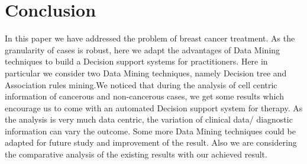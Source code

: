 \documentclass[conference]{IEEEtran}
\begin{document}




\section{Conclusion}
In this paper we have addressed the problem of breast cancer treatment. As the granularity of cases is robust,  here we adapt the advantages of Data Mining techniques to build a Decision support systems for practitioners. Here in particular we consider two Data Mining techniques, namely Decision tree and Association rules mining.We noticed that during the analysis of cell centric information of cancerous and non-cancerous cases, we get some results which encourage us to come with an automated Decision support system for therapy. As the analysis is very much data centric, the variation of clinical data/ diagnostic information can vary the outcome. Some more Data Mining techniques could be adapted for future study and improvement of the result. Also we are considering the  comparative analysis  of the existing results with our achieved result.







%
%





\end{document}
